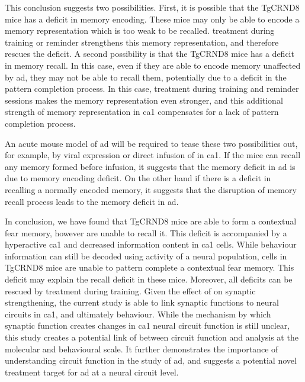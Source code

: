 This conclusion suggests two possibilities. First, it is possible that the TgCRND8 mice has a deficit in memory encoding. These mice may only be able to encode a memory representation which is too weak to be recalled. \tglu{} treatment during training or reminder strengthens this memory representation, and therefore rescues the deficit. A second possibility is that the TgCRND8 mice has a deficit in memory recall. In this case, even if they are able to encode memory unaffected by \gls{ad}, they may not be able to recall them, potentially due to a deficit in the pattern completion process. In this case, \tglu{} treatment during training and reminder sessions makes the memory representation even stronger, and this additional strength of memory representation in \gls{ca1} compensates for a lack of pattern completion process. 

An acute mouse model of \gls{ad} will be required to tease these two possibilities out, for example, by viral expression or direct infusion of \abeta{} in \gls{ca1}. If the mice can recall any memory formed before \abeta{} infusion, it suggests that the memory deficit in \gls{ad} is due to memory encoding deficit. On the other hand if there is a deficit in recalling a normally encoded memory, it suggests that the disruption of memory recall process leads to the memory deficit in \gls{ad}.

In conclusion, we have found that TgCRND8 mice are able to form a contextual fear memory, however are unable to recall it. This deficit is accompanied by a hyperactive \gls{ca1} and decreased information content in \gls{ca1} cells. While behaviour information can still be decoded using activity of a neural population, cells in TgCRND8 mice are unable to pattern complete a contextual fear memory. This deficit may explain the recall deficit in these mice. Moreover, all deficits can be rescued by \tglu{} treatment during training. Given the effect of \tglu{} on synaptic strengthening, the current study is able to link synaptic functions to neural circuits in \gls{ca1}, and ultimately behaviour. While the mechanism by which synaptic function creates changes in \gls{ca1} neural circuit function is still unclear, this study creates a potential link of between circuit function and analysis at the molecular and behavioural scale. It further demonstrates the importance of understanding circuit function in the study of \gls{ad}, and suggests a potential novel treatment target for \gls{ad} at a neural circuit level. 

